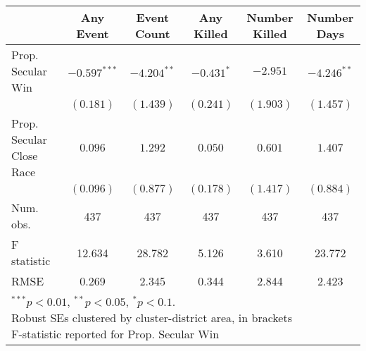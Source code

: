 
\begin{tabular}{l c c c c c }
\hline
 & Any Event & Event Count & Any Killed & Number Killed & Number Days \\
\hline
Prop. Secular Win        & $-0.597^{***}$ & $-4.204^{**}$ & $-0.431^{*}$ & $-2.951$  & $-4.246^{**}$ \\
                         & $(0.181)$      & $(1.439)$     & $(0.241)$    & $(1.903)$ & $(1.457)$     \\
Prop. Secular Close Race & $0.096$        & $1.292$       & $0.050$      & $0.601$   & $1.407$       \\
                         & $(0.096)$      & $(0.877)$     & $(0.178)$    & $(1.417)$ & $(0.884)$     \\
\hline
Num. obs.                & 437            & 437           & 437          & 437       & 437           \\
F statistic              & 12.634         & 28.782        & 5.126        & 3.610     & 23.772        \\
RMSE                     & 0.269          & 2.345         & 0.344        & 2.844     & 2.423         \\
\hline
\multicolumn{6}{l}{\scriptsize{\parbox{.4\linewidth}{\vspace{2pt}$^{***}p<0.01$, $^{**}p<0.05$, $^*p<0.1$. \\
       Robust SEs clustered by cluster-district area, in brackets\\ F-statistic reported for Prop. Secular Win}}}
\end{tabular}
